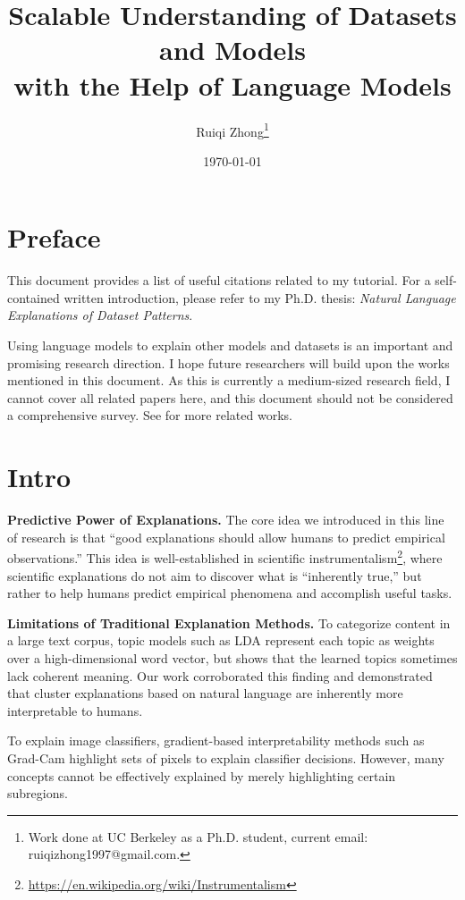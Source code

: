 \documentclass[12pt]{article}
\title{Scalable Understanding of Datasets and Models \\with the Help of Language Models}
\author{Ruiqi Zhong\footnote{Work done at UC Berkeley as a Ph.D. student, current email: ruiqizhong1997@gmail.com.} }
\date{\today}
\begin{document}
\maketitle

\section*{Preface}
This document provides a list of useful citations related to my tutorial.
For a self-contained written introduction, please refer to my Ph.D. thesis: \textit{Natural Language Explanations of Dataset Patterns}.

Using language models to explain other models and datasets is an important and promising research direction. I hope future researchers will build upon the works mentioned in this document.
As this is currently a medium-sized research field, I cannot cover all related papers here, and this document should not be considered a comprehensive survey.
See \citet{singh2024rethinking} for more related works.

\section{Intro} \label{sec:intro}

\noindent \textbf{Predictive Power of Explanations.} 
The core idea we introduced in this line of research is that ``good explanations should allow humans to predict empirical observations.''
This idea is well-established in scientific instrumentalism\footnote{\url{https://en.wikipedia.org/wiki/Instrumentalism}}, where scientific explanations do not aim to discover what is ``inherently true,'' but rather to help humans predict empirical phenomena and accomplish useful tasks.

\noindent \textbf{Limitations of Traditional Explanation Methods.} 
To categorize content in a large text corpus, topic models such as LDA \citep{blei2003latent} represent each topic as weights over a high-dimensional word vector, but \citet{chang2009reading} shows that the learned topics sometimes lack coherent meaning.
Our work \citep{wang-etal-2023-goal} corroborated this finding and demonstrated that cluster explanations based on natural language are inherently more interpretable to humans.

To explain image classifiers, gradient-based interpretability methods such as Grad-Cam \citep{selvaraju2017grad} highlight sets of pixels to explain classifier decisions.
However, many concepts cannot be effectively explained by merely highlighting certain subregions.
\end{document}
